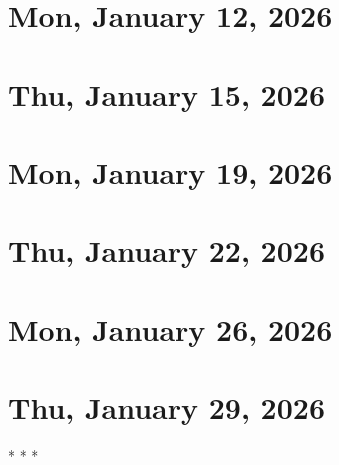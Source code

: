 \documentclass[a4paper]{report}
\begin{document}
\chapter{Mon, January 12, 2026}


\chapter{Thu, January 15, 2026}


\chapter{Mon, January 19, 2026}


\chapter{Thu, January 22, 2026}


\chapter{Mon, January 26, 2026}


\chapter{Thu, January 29, 2026}


%

\centering
* * *
%
\end{document}
